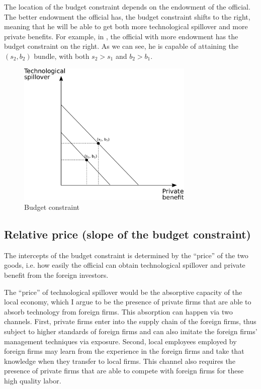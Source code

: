 The location of the budget constraint depends on the endowment of the official. The better endowment the official has, the budget constraint shifts to the right, meaning that he will be able to get both more technological spillover and more private benefits. For example, in , the official with more endowment has the budget constraint on the right. As we can see, he is capable of attaining the $(s_2, b_2)$ bundle, with both $s_2 > s_1$ and $b_2 > b_1$.

\begin{figure}[!ht]
	\centering
    \includegraphics[width=0.75\textwidth, height=0.75\textheight,keepaspectratio]{../figure/budget_constraint}
    \caption{Budget constraint}
    \label{fig:budget_constraint}
\end{figure}

\subsection{Relative price (slope of the budget constraint)}

The intercepts of the budget constraint is determined by the ``price'' of the two goods, i.e. how easily the official can obtain technological spillover and private benefit from the foreign investors.

The ``price'' of technological spillover would be the absorptive capacity of the local economy, which I argue to be the presence of private firms that are able to absorb technology from foreign firms. This absorption can happen via two channels. First, private firms enter into the supply chain of the foreign firms, thus subject to higher standards of foreign firms and can also imitate the foreign firms' management techniques via exposure. Second, local employees employed by foreign firms may learn from the experience in the foreign firms and take that knowledge when they transfer to local firms. This channel also requires the presence of private firms that are able to compete with foreign firms for these high quality labor.


